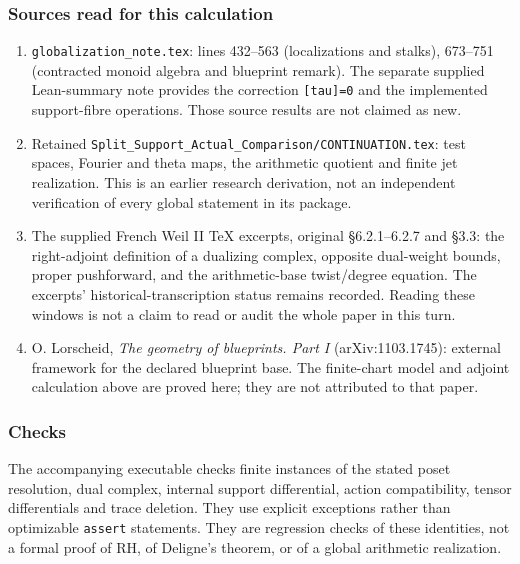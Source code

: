 \documentclass{article}
\begin{document}
\subsubsection{Sources read for this calculation}\label{endpoint-tau_base--sources-read-for-this-calculation}

\begin{enumerate}
\def\labelenumi{\arabic{enumi}.}
\tightlist
\item
  \nolinkurl{globalization_note.tex}: lines 432--563 (localizations and stalks), 673--751 (contracted monoid algebra and blueprint remark). The separate supplied Lean-summary note provides the correction \texttt{{[}tau{]}=0} and the implemented support-fibre operations. Those source results are not claimed as new.
\item
  Retained \nolinkurl{Split_Support_Actual_Comparison/CONTINUATION.tex}: test spaces, Fourier and theta maps, the arithmetic quotient and finite jet realization. This is an earlier research derivation, not an independent verification of every global statement in its package.
\item
  The supplied French Weil II TeX excerpts, original §6.2.1--6.2.7 and §3.3: the right-adjoint definition of a dualizing complex, opposite dual-weight bounds, proper pushforward, and the arithmetic-base twist/degree equation. The excerpts' historical-transcription status remains recorded. Reading these windows is not a claim to read or audit the whole paper in this turn.
\item
  O. Lorscheid, \emph{The geometry of blueprints. Part I} (arXiv:1103.1745): external framework for the declared blueprint base. The finite-chart model and adjoint calculation above are proved here; they are not attributed to that paper.
\end{enumerate}

\subsubsection{Checks}\label{endpoint-tau_base--checks}

The accompanying executable checks finite instances of the stated poset resolution, dual complex, internal support differential, action compatibility, tensor differentials and trace deletion. They use explicit exceptions rather than optimizable \nolinkurl{assert} statements. They are regression checks of these identities, not a formal proof of RH, of Deligne's theorem, or of a global arithmetic realization.

\endgroup
\end{document}
